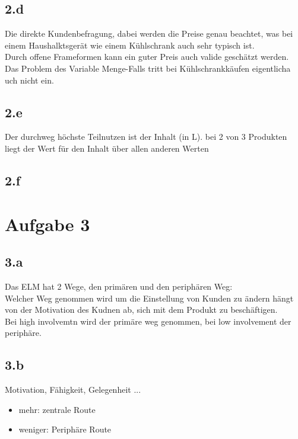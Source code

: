 \subsection*{2.d}
    Die direkte Kundenbefragung, dabei werden die Preise genau beachtet, was bei einem Haushalktsgerät wie einem Kühlschrank auch sehr typisch ist. \\
    Durch offene Frameformen kann ein guter Preis auch valide geschätzt werden. Das Problem des Variable Menge-Falls tritt bei Kühlschrankkäufen eigentlicha uch nicht ein.

\subsection*{2.e}
    Der durchweg höchste Teilnutzen ist der Inhalt (in L). bei 2 von 3 Produkten liegt der Wert für den Inhalt über allen anderen Werten

\subsection*{2.f}


\section*{Aufgabe 3}
\subsection*{3.a}
    Das ELM hat 2 Wege, den primären und den periphären Weg: \\
    Welcher Weg genommen wird um die Einstellung von Kunden zu ändern hängt von der Motivation des Kudnen ab, sich mit dem Produkt zu beschäftigen. \\
    Bei high involvemtn wird der primäre weg genommen, bei low involvement der periphäre.

\subsection*{3.b}
    Motivation, Fähigkeit, Gelegenheit ... 
    \begin{itemize}
        \item mehr: zentrale Route
        \item weniger: Periphäre Route
    \end{itemize}

